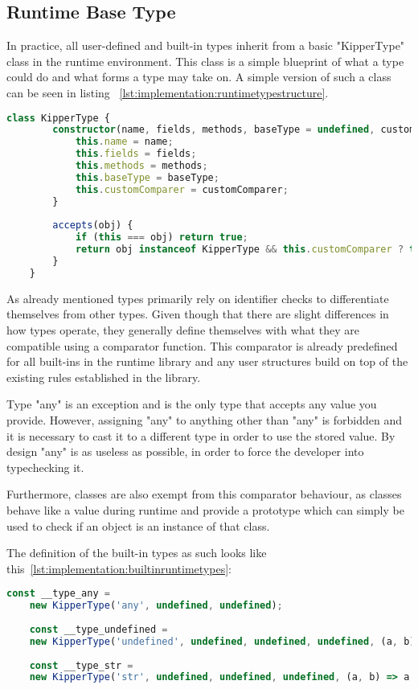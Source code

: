 \subsection{Runtime Base Type}

In practice, all user-defined and built-in types inherit from a basic "KipperType" class in the runtime environment. This class is a simple blueprint of what a type could do and what forms a type may take on. A simple version of such a class can be seen in listing ~\ref{lst:implementation:runtimetypestructure}.

\begin{lstlisting}[language=TypeScript,caption=The structure of a runtime type,label=lst:implementation:runtimetypestructure]
	class KipperType {
		constructor(name, fields, methods, baseType = undefined, customComparer = undefined) {
			this.name = name; 
			this.fields = fields;
			this.methods = methods;
			this.baseType = baseType;
			this.customComparer = customComparer;
		}
		
		accepts(obj) {
			if (this === obj) return true;
			return obj instanceof KipperType && this.customComparer ? this.customComparer(this, obj) : false;
		}
	}
\end{lstlisting}

As already mentioned types primarily rely on identifier checks to differentiate themselves from other types. Given though that there are slight differences in how types operate, they generally define themselves with what they are compatible using a comparator function. This comparator is already predefined for all built-ins in the runtime library and any user structures build on top of the existing rules established in the library.

Type "any" is an exception and is the only type that accepts any value you provide. However, assigning "any" to anything other than "any" is forbidden and it is necessary to cast it to a different type in order to use the stored value. By design "any" is as useless as possible, in order to force the developer into typechecking it.

Furthermore, classes are also exempt from this comparator behaviour, as classes behave like a value during runtime and provide a prototype which can simply be used to check if an object is an instance of that class.

The definition of the built-in types as such looks like this~\ref{lst:implementation:builtinruntimetypes}:

\begin{lstlisting}[language=TypeScript,caption=Examples for the builtin runtime types,label=lst:implementation:builtinruntimetypes]
	const __type_any = 
	new KipperType('any', undefined, undefined);
	
	const __type_undefined = 
	new KipperType('undefined', undefined, undefined, undefined, (a, b) => a.name === b.name);
	
	const __type_str = 
	new KipperType('str', undefined, undefined, undefined, (a, b) => a.name === b.name);
\end{lstlisting}

